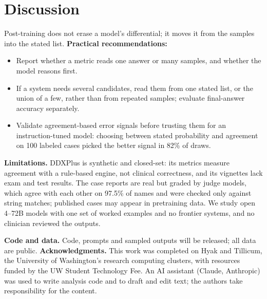 \documentclass[letterpaper]{article} %
\begin{document}
\section{Discussion}
Post-training does not erase a model's differential; it moves it from the samples into the stated list. \textbf{Practical recommendations:}
\begin{itemize}
\item Report whether a metric reads one answer or many samples, and whether the model reasons first.
\item If a system needs several candidates, read them from one stated list, or the union of a few, rather than from repeated samples; evaluate final-answer accuracy separately.
\item Validate agreement-based error signals before trusting them for an instruction-tuned model: choosing between stated probability and agreement on 100 labeled cases picked the better signal in 82\% of draws.
\end{itemize}

\textbf{Limitations.} DDXPlus is synthetic and closed-set: its metrics measure agreement with a rule-based engine, not clinical correctness, and its vignettes lack exam and test results. The case reports are real but graded by judge models, which agree with each other on 97.5\% of names and were checked only against string matches; published cases may appear in pretraining data. We study open 4--72B models with one set of worked examples and no frontier systems, and no clinician reviewed the outputs.

\textbf{Code and data.} Code, prompts and sampled outputs will be released; all data are public. \textbf{Acknowledgments.} This work was completed on Hyak and Tillicum, the University of Washington's research computing clusters, with resources funded by the UW Student Technology Fee. An AI assistant (Claude, Anthropic) was used to write analysis code and to draft and edit text; the authors take responsibility for the content.


\end{document}
